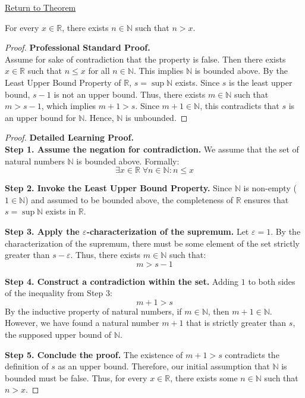 \newpage
{}
\label{prf:archimedean-property}

\begin{remark*}[Return]
\hyperref[thm:archimedean-property]{Return to Theorem}
\end{remark*}

\begin{theorem*}
For every $x \in \mathbb{R}$, there exists $n \in \mathbb{N}$ such that $n > x$.
\end{theorem*}

\begin{proof}
\textbf{Professional Standard Proof.}~\\
Assume for sake of contradiction that the property is false. Then there exists $x \in \mathbb{R}$ such that $n \le x$ for all $n \in \mathbb{N}$. This implies $\mathbb{N}$ is bounded above. By the Least Upper Bound Property of $\mathbb{R}$, $s = \sup \mathbb{N}$ exists. Since $s$ is the least upper bound, $s-1$ is not an upper bound. Thus, there exists $m \in \mathbb{N}$ such that $m > s-1$, which implies $m+1 > s$. Since $m+1 \in \mathbb{N}$, this contradicts that $s$ is an upper bound for $\mathbb{N}$. Hence, $\mathbb{N}$ is unbounded.
\end{proof}

\begin{proof}
\textbf{Detailed Learning Proof.}~\\

\textbf{Step 1. Assume the negation for contradiction.}
We assume that the set of natural numbers $\mathbb{N}$ is bounded above. Formally:
\[ \exists x \in \mathbb{R} \; \forall n \in \mathbb{N} : n \le x \]

\textbf{Step 2. Invoke the Least Upper Bound Property.}
Since $\mathbb{N}$ is non-empty ($1 \in \mathbb{N}$) and assumed to be bounded above, the completeness of $\mathbb{R}$ ensures that $s = \sup \mathbb{N}$ exists in $\mathbb{R}$.

\textbf{Step 3. Apply the $\varepsilon$-characterization of the supremum.}
Let $\varepsilon = 1$. By the characterization of the supremum, there must be some element of the set strictly greater than $s - \varepsilon$. Thus, there exists $m \in \mathbb{N}$ such that:
\[ m > s - 1 \]

\textbf{Step 4. Construct a contradiction within the set.}
Adding $1$ to both sides of the inequality from Step 3:
\[ m + 1 > s \]
By the inductive property of natural numbers, if $m \in \mathbb{N}$, then $m + 1 \in \mathbb{N}$. However, we have found a natural number $m+1$ that is strictly greater than $s$, the supposed upper bound of $\mathbb{N}$.

\textbf{Step 5. Conclude the proof.}
The existence of $m+1 > s$ contradicts the definition of $s$ as an upper bound. Therefore, our initial assumption that $\mathbb{N}$ is bounded must be false. Thus, for every $x \in \mathbb{R}$, there exists some $n \in \mathbb{N}$ such that $n > x$.
\end{proof}

